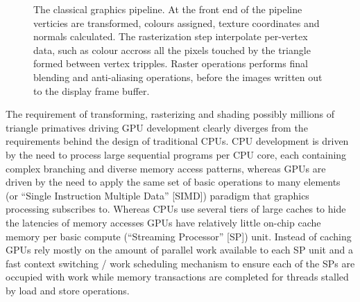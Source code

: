 \begin{figure}[ht!]
 \begin{mdframed}
 \centering
 \caption[Graphics pipeline]{The classical graphics pipeline. At the front end of the pipeline verticies are transformed, colours assigned,
 texture coordinates and normals calculated. The rasterization step interpolate per-vertex data, such as colour accross all the pixels 
 touched by the triangle formed between vertex tripples. Raster operations performs final blending and anti-aliasing operations, before the images written
 out to the display frame buffer.}
 \label{fig_graphics_pipeline}
 \end{mdframed}
\end{figure}

The requirement of transforming, rasterizing and shading possibly millions of triangle primatives driving GPU development clearly diverges from the requirements behind the
design of traditional CPUs. CPU development is driven by the need to process large sequential programs per CPU core, each containing complex branching and diverse memory access patterns, 
whereas GPUs are driven by the need to apply the same set of basic operations to many elements (or ``Single Instruction Multiple Data'' [SIMD]) paradigm that graphics processing subscribes to. 
Whereas CPUs use several tiers of large caches to hide the latencies of memory accesses GPUs have relatively little on-chip cache memory per basic compute (``Streaming Processor'' [SP]) 
unit. Instead of caching GPUs rely mostly on the amount of parallel work available to each SP unit and a fast context switching / work scheduling mechanism to ensure each of the SPs are 
occupied with work while memory transactions are completed for threads stalled by load and store operations.

